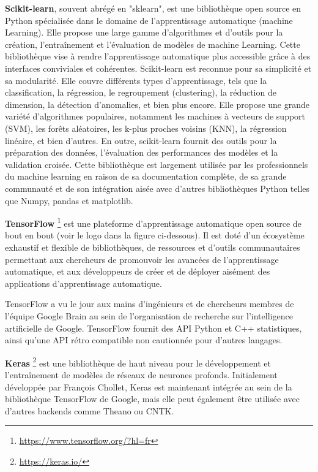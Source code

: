 \textbf{Scikit-learn}, souvent abrégé en "sklearn", est une bibliothèque open source en Python spécialisée dans le domaine de l'apprentissage automatique (machine Learning). Elle propose une large gamme d'algorithmes et d'outils pour la création, l'entraînement et l'évaluation de modèles de machine Learning. Cette bibliothèque vise à rendre l'apprentissage automatique plus accessible grâce à des interfaces conviviales et cohérentes.
Scikit-learn est reconnue pour sa simplicité et sa modularité. Elle couvre différents types d'apprentissage, tels que la classification, la régression, le regroupement (clustering), la réduction de dimension, la détection d'anomalies, et bien plus encore. Elle propose une grande variété d'algorithmes populaires, notamment les machines à vecteurs de support (SVM), les forêts aléatoires, les k-plus proches voisins (KNN), la régression linéaire, et bien d'autres.
En outre, scikit-learn fournit des outils pour la préparation des données, l'évaluation des performances des modèles et la validation croisée. Cette bibliothèque est largement utilisée par les professionnels du machine learning en raison de sa documentation complète, de sa grande communauté et de son intégration aisée avec d'autres bibliothèques Python telles que Numpy, pandas et matplotlib.

\textbf{TensorFlow} \footnote{\href{https://www.tensorflow.org/?hl=fr}{https://www.tensorflow.org/?hl=fr}} est une plateforme d’apprentissage automatique open source de bout en bout (voir le logo dans la figure ci-dessous). Il est doté d’un écosystème exhaustif et flexible de bibliothèques, de ressources et d’outils communautaires permettant aux chercheurs de promouvoir les avancées de l’apprentissage automatique, et aux développeurs de créer et de déployer aisément des applications d’apprentissage automatique.\par
 TensorFlow a vu le jour aux mains d’ingénieurs et de chercheurs membres de l’équipe Google Brain au sein de l’organisation de recherche sur l’intelligence artificielle de Google. TensorFlow fournit des API Python et C++ statistiques, ainsi qu’une API rétro compatible non cautionnée pour d’autres langages. \par

\textbf{Keras} \footnote{\href{https://keras.io/}{https://keras.io/}}  est une bibliothèque de haut niveau pour le développement et l'entraînement de modèles de réseaux de neurones profonds. Initialement développée par François Chollet, Keras est maintenant intégrée au sein de la bibliothèque TensorFlow de Google, mais elle peut également être utilisée avec d'autres backends comme Theano ou CNTK. \par

